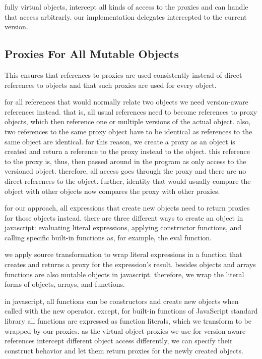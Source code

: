 fully virtual objects, intercept all kinds of access to the proxies and can handle that access arbitrarly.
our implementation delegates intercepted to the current version.



\subsection{Proxies For All Mutable Objects}

This ensures that references to proxies are used consistently instead of direct references to objects and that such proxies are used for every object.

for all references that would normally relate two objects we need version-aware references instead.
that is, all usual references need to become references to proxy objects, which then reference one or multiple versions of the actual object.
also, two references to the same proxy object have to be identical as references to the same object are identical.
for this reason, we create a proxy as an object is created and return a reference to the proxy instead to the object.
this reference to the proxy is, thus, then passed around in the program as only access to the versioned object.
therefore, all access goes through the proxy and there are no direct references to the object.
further, identity that would usually compare the object with other objects now compares the proxy with other proxies.

for our approach, all expressions that create new objects need to return proxies for those objects instead.
there are three different ways to create an object in javascript: evaluating literal expressions, applying constructor functions, and calling specific built-in functions as, for example, the eval function.

we apply source transformation to wrap literal expressions in a function that creates and returns a proxy for the expression's result.
besides objects and arrays functions are also mutable objects in javascript.
therefore, we wrap the literal forms of objects, arrays, and functions.

in javascript, all functions can be constructors and create new objects when called with the new operator.
except, for built-in functions of JavaScript standard library all functions are expressed as function literals, which we transform to be wrapped by our proxies.
as the virtual object proxies we use for version-aware references intercept different object access differently, we can specify their construct behavior and let them return proxies for the newly created objects.

